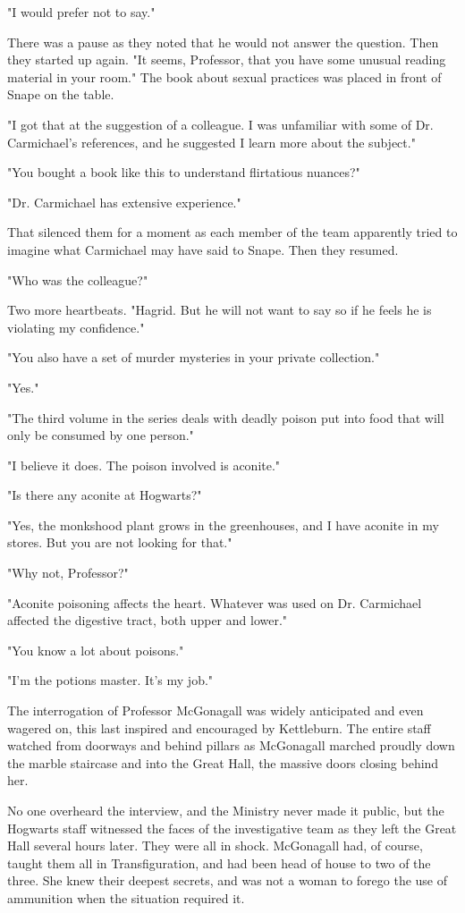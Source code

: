 "I would prefer not to say."

There was a pause as they noted that he would not answer the question. Then they started up again. "It seems, Professor, that you have some unusual reading material in your room." The book about sexual practices was placed in front of Snape on the table.

"I got that at the suggestion of a colleague. I was unfamiliar with some of Dr. Carmichael's references, and he suggested I learn more about the subject."

"You bought a book like this to understand flirtatious nuances?"

"Dr. Carmichael has extensive experience."

That silenced them for a moment as each member of the team apparently tried to imagine what Carmichael may have said to Snape. Then they resumed.

"Who was the colleague?"

Two more heartbeats. "Hagrid. But he will not want to say so if he feels he is violating my confidence."

"You also have a set of murder mysteries in your private collection."

"Yes."

"The third volume in the series deals with deadly poison put into food that will only be consumed by one person."

"I believe it does. The poison involved is aconite."

"Is there any aconite at Hogwarts?"

"Yes, the monkshood plant grows in the greenhouses, and I have aconite in my stores. But you are not looking for that."

"Why not, Professor?"

"Aconite poisoning affects the heart. Whatever was used on Dr. Carmichael affected the digestive tract, both upper and lower."

"You know a lot about poisons."

"I'm the potions master. It's my job."

The interrogation of Professor McGonagall was widely anticipated and even wagered on, this last inspired and encouraged by Kettleburn. The entire staff watched from doorways and behind pillars as McGonagall marched proudly down the marble staircase and into the Great Hall, the massive doors closing behind her.

No one overheard the interview, and the Ministry never made it public, but the Hogwarts staff witnessed the faces of the investigative team as they left the Great Hall several hours later. They were all in shock. McGonagall had, of course, taught them all in Transfiguration, and had been head of house to two of the three. She knew their deepest secrets, and was not a woman to forego the use of ammunition when the situation required it.

